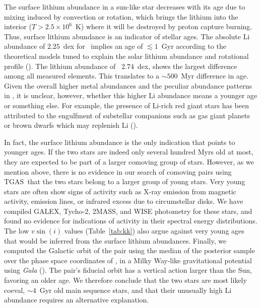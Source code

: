 \documentclass[modern, letterpaper]{aastex61}
\newcommand{\project}[1]{\textsl{#1}}
\newcommand{\acronym}[1]{{\small{#1}}}
\newcommand{\tgas}{\acronym{TGAS}}
\newcommand*\elem[1]{\ensuremath{\mathrm{#1}}}
\newcommand{\sunanalog}{\text{Krios}}
\newcommand{\bizarreone}{\text{Kronos}}
\renewcommand\tablename{Table}
\begin{document}
The surface lithium abundance in a sun-like star decreases with its age due to
mixing induced by convection or rotation, which brings the lithium into the
interior ($T>2.5 \times 10^{6}$~K) where it will be destroyed by proton capture
burning.
Thus, surface lithium abundance is an indicator of stellar ages.
The absolute $\elem{Li}$ abundance of $2.25$~dex for \sunanalog\ implies an age
of $\lesssim 1$~Gyr according to the theoretical models tuned to explain the
solar lithium abundance and rotational profile (\citealt{2005Sci...309.2189C}).
The lithium abundance of \bizarreone\, $2.74$~dex, shows the largest difference
among all measured elements.
This translates to a $\sim 500$~Myr difference in age.
Given the overall higher metal abundances and the peculiar abundance patterns
in \bizarreone, it is unclear, however, whether this higher $\elem{Li}$
abundance means a younger age or something else.
For example, the presence of $\elem{Li}$-rich red giant stars has been
attributed to the engulfment of substellar companions such as gas giant planets
or brown dwarfs which may replenish $\elem{Li}$ (\citealt{Casey:2016aa}).

In fact, the surface lithium abundance is the only indication that points to younger ages.
If the two stars are indeed only several hundred Myrs old at most,
they are expected to be part of a larger comoving group of stars.
However, as we mention above, there is no evidence in our search of comoving pairs
using \tgas\ that the two stars belong to a larger group of young stars.
Very young stars are often show signs of activity such as
X-ray emission from magnetic activity, emission lines, or infrared excess due to
circumstellar disks.
We have compiled GALEX, Tycho-2, 2MASS, and WISE photometry for these stars,
and found no evidence for indications of activity in their spectral energy
distributions.
The low $v\sin(i)$ values (\tablename~\ref{tab:kk}) also argue against very
young ages that would be inferred from the surface lithium abundances.
Finally, we computed the Galactic orbit of the pair using the median of the
posterior sample over the phase space coordinates of \sunanalog, in a Milky
Way-like gravitational potential using \project{Gala} (\citealt{gala}).
The pair's fiducial orbit has a vertical action larger than the Sun, favoring
an older age.
We therefore conclude that the two stars are most likely coeval, $\sim 4$~Gyr
old main sequence stars, and that their unusually high \elem{Li} abundance
requires an alternative explanation.
\end{document}
